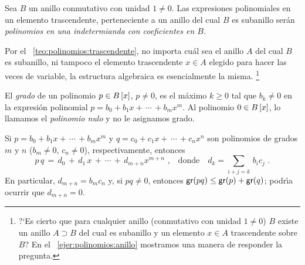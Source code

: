 \begin{defPolinomios}\label{def:polinomios:indeterminada}
	Sea $B$ un anillo conmutativo con unidad $1\neq 0$. Las
	expresiones polinomiales en un elemento trascendente,
	perteneciente a un anillo del cual $B$ es subanillo ser\'an
	\emph{polinomios en una indetermianda con coeficientes en $B$}.
\end{defPolinomios}

\begin{obsPolinomios}\label{obs:polinomios:indeterminada}
	Por el \teoname~\ref{teo:polinomios:trascendente}, no importa
	cu\'al sea el anillo $A$ del cual $B$ es subanillo, ni tampoco el
	elemento trascendente $x\in A$ elegido para hacer las veces de
	variable, la estructura algebraica es esencialmente la misma.%
	\footnote{
		?`Es cierto que para cualquier anillo (conmutativo con
		unidad $1\neq 0$) $B$ existe un anillo $A\supset B$ del
		cual es subanillo y un elemento $x\in A$ trascendente
		sobre $B$?
		En el \ejername~\ref{ejer:polinomios:anillo} mostramos
		una manera de responder la pregunta.
	}
\end{obsPolinomios}

\begin{defPolinomios}\label{def:polinomios:grado}
	El \emph{grado} de un polinomio $p\in{B}\left[x\right]$, $p\neq 0$,
	es el m\'aximo $k\geq 0$ tal que $b_k\neq 0$ en la expresi\'on
	polinomial $p=b_0+b_1x+\,\cdots\,+b_mx^m$.
	Al polinomio $0\in{B}\left[x\right]$, lo llamamos el
	\emph{polinomio nulo} y no le asignamos grado.
\end{defPolinomios}

Si $p=b_0+b_1x+\,\cdots\,+b_mx^m$ y $q=c_0+c_1x+\,\cdots\,+c_nx^n$ son
polinomios de grados $m$ y $n$ ($b_m\neq 0$, $c_n\neq 0$), respectivamente,
entonces
\begin{displaymath}
	p\,q\,=\,d_0\,+\,d_1\,x\,+\,\cdots\,+\,d_{m+n}x^{m+n}
		\text{ ,}\quad\text{donde}\quad
		d_k=\sum_{i+j=k}\,b_ic_j
	\text{ .}
\end{displaymath}
%
En particular, $d_{m+n}=b_mc_n$ y, si $pq\neq 0$, entonces
$\mathsf{gr}(pq)\leq\mathsf{gr}(p)+\mathsf{gr}(q)$; podr\'{\i}a ocurrir que $d_{m+n}=0$.

